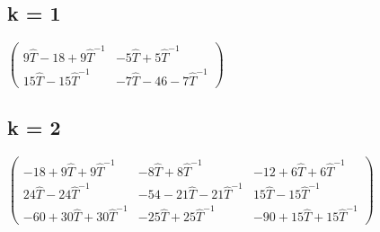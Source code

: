 \documentclass[10pt,letterpaper]{article}
\begin{document}
  
  
  \subsection{k = 1}
  $\left(\begin{array}{cc}
      9\hat{T}-18+9\hat{T}^{-1} & -5\hat{T} + 5\hat{T}^{-1} \\
      15 \hat{T} -15 \hat{T}^{-1} & -7 \hat{T} - 46 - 7\hat{T}^{-1}
    \end{array}\right)$
    
  \subsection{k = 2}
  $\left(
\begin{array}{ccc}
 -18+9 \hat{T}+9 \hat{T}^{-1} & -8 \hat{T}+8 \hat{T}^{-1} & -12+6 \hat{T}+6 \hat{T}^{-1} \\
 24 \hat{T}-24 \hat{T}^{-1} & -54-21 \hat{T}-21 \hat{T}^{-1} & 15 \hat{T}-15 \hat{T}^{-1} \\
 -60+30 \hat{T}+30 \hat{T}^{-1} & -25 \hat{T}+25 \hat{T}^{-1} & -90+15 \hat{T}+15 \hat{T}^{-1}
\end{array}
\right)$
\end{document}
